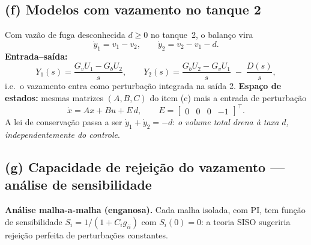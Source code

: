 \documentclass[11pt,a4paper]{article}
\begin{document}
\subsection*{(f) Modelos com vazamento no tanque 2}

Com vaz\~ao de fuga desconhecida $d\ge0$ no tanque~2, o balan\c{c}o vira
\[
\dot y_1=v_1-v_2,
\qquad
\dot y_2=v_2-v_1-d .
\]
\textbf{Entrada--sa\'ida:}
\[
Y_1(s)=\frac{G_v U_1-G_b U_2}{s},
\qquad
Y_2(s)=\frac{G_b U_2-G_v U_1}{s}\;-\;\frac{D(s)}{s},
\]
i.e.\ o vazamento entra como perturba\c{c}\~ao integrada na sa\'ida 2.
\textbf{Espa\c{c}o de estados:} mesmas matrizes $(A,B,C)$ do item (c) mais a
entrada de perturba\c{c}\~ao
\[
\dot x=Ax+Bu+E\,d,
\qquad
E=\begin{bmatrix}0&0&0&-1\end{bmatrix}^{\!\top}.
\]
A lei de conserva\c{c}\~ao passa a ser $\dot y_1+\dot y_2=-d$: \emph{o volume total
drena \`a taxa $d$, independentemente do controle}.

\subsection*{(g) Capacidade de rejei\c{c}\~ao do vazamento --- an\'alise de sensibilidade}

\textbf{An\'alise malha-a-malha (enganosa).} Cada malha isolada, com PI, tem
fun\c{c}\~ao de sensibilidade $S_i=1/(1+C_ig_{ii})$ com $S_i(0)=0$: a teoria SISO
sugeriria rejei\c{c}\~ao perfeita de perturba\c{c}\~oes constantes.
\end{document}
